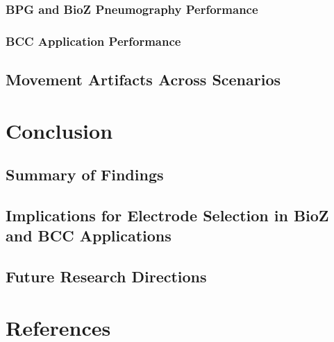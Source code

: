 \documentclass[conference]{IEEEtran}
\begin{document}
\subsubsection{BPG and BioZ Pneumography Performance}
\subsubsection{BCC Application Performance}
\subsection{Movement Artifacts Across Scenarios}

\section{Conclusion}
\subsection{Summary of Findings}
\subsection{Implications for Electrode Selection in BioZ and BCC Applications}
\subsection{Future Research Directions}

\section*{References}




\end{document}
